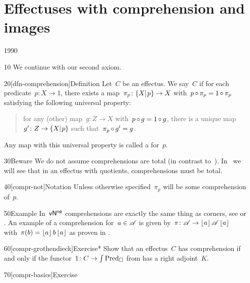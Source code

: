 \section{Effectuses with comprehension and images}
\begin{parsec}{1990}%
\begin{point}{10}%
We continue with our second axiom.
\end{point}
\begin{point}{20}[dfn-comprehension]{Definition}%
Let~$C$ be an effectus.
We say~$C$ 
    if for each predicate~$p \colon X \to 1$,
    there exists a map~$\pi_p \colon \{X|{\kern.2ex}p\} \to X$
    with~$p \mathop{\circ} \pi_p = 1 \mathop{\circ} \pi_p$
    satisfying the following universal property:
\begin{quote}
    for any (other) map~$g\colon Z \to X$
        with~$p \mathop{\circ} g = 1 \mathop{\circ} g$,
        there is a unique map~$g' \colon Z \to \{X|{\kern.2ex}p\}$
        such that~$\pi_p \mathop{\circ} g' = g$.
\end{quote}
Any  map with this universal property
    is called a  for~$p$.
\begin{point}{30}{Beware}%
    We do not assume comprehensions are total
    (in contrast to~\cite{effintro}).
    In~ we will see that
    in an effectus with quotients, comprehensions must be total.
\end{point}
\begin{point}{40}[compr-not]{Notation}%
Unless otherwise specified~$\pi_p$ will be some
    comprehension of~$p$.
\end{point}
\end{point}
\begin{point}{50}{Example}%
In~${\mathsf{vN}}{^{\mathsf{op}}}$ comprehensions are exactly the same thing
    as corners, see  or .
An example of a comprehension for~$a \in \mathscr{A}$
    is given by~$\pi\colon \mathscr{A} \to \left\lfloor a\right\rfloor\mathscr{A}\left\lfloor a\right\rfloor$
    with~$\pi(b) = \left\lfloor a\right\rfloor b\left\lfloor a\right\rfloor$
    as proven in .
\end{point}
\begin{point}{60}[compr-grothendieck]{Exercise*}%
    Show that an effectus~$C$ has comprehension if and only
        if the functor~$1 \colon C \to \int \operatorname{Pred}_\square$
        from 
        has a right adjoint~$K$.
\end{point}
\begin{point}{70}[compr-basics]{Exercise}%

\end{point}
\end{parsec}
